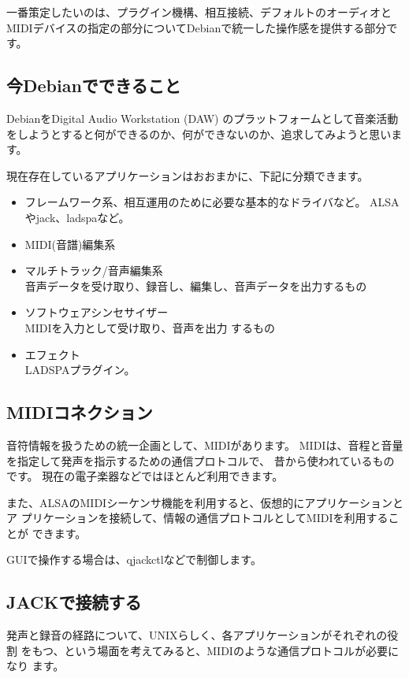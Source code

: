 \documentclass[mingoth,a4paper]{jsarticle}
\begin{document}
一番策定したいのは、プラグイン機構、相互接続、デフォルトのオーディオと
MIDIデバイスの指定の部分についてDebianで統一した操作感を提供する部分です。

\subsection{今Debianでできること}

DebianをDigital Audio Workstation (DAW) のプラットフォームとして音楽活動
をしようとすると何ができるのか、何ができないのか、追求してみようと思いま
す。

現在存在しているアプリケーションはおおまかに、下記に分類できます。

\begin{itemize}
 \item フレームワーク系、相互運用のために必要な基本的なドライバなど。
       ALSAやjack、ladspaなど。
 \item MIDI(音譜)編集系
 \item マルチトラック/音声編集系\\
       音声データを受け取り、録音し、編集し、音声データを出力するもの
 \item ソフトウェアシンセサイザー\\MIDIを入力として受け取り、音声を出力
       するもの
 \item エフェクト\\LADSPAプラグイン。
\end{itemize}

\subsection{MIDIコネクション}

音符情報を扱うための統一企画として、MIDIがあります。
MIDIは、音程と音量を指定して発声を指示するための通信プロトコルで、
昔から使われているものです。
現在の電子楽器などではほとんど利用できます。

また、ALSAのMIDIシーケンサ機能を利用すると、仮想的にアプリケーションとア
プリケーションを接続して、情報の通信プロトコルとしてMIDIを利用することが
できます。

GUIで操作する場合は、qjackctlなどで制御します。

\subsection{JACKで接続する}

発声と録音の経路について、UNIXらしく、各アプリケーションがそれぞれの役割
をもつ、という場面を考えてみると、MIDIのような通信プロトコルが必要になり
ます。
\end{document}
